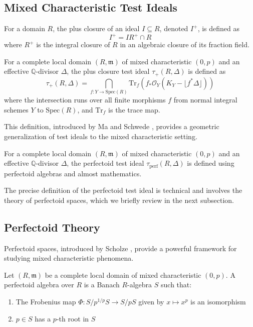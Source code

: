 \subsection{Mixed Characteristic Test Ideals}

\begin{definition}\label{def:plus-closure}
For a domain $R$, the plus closure of an ideal $I \subseteq R$, denoted $I^+$, is defined as
$$I^+ = I R^+ \cap R$$
where $R^+$ is the integral closure of $R$ in an algebraic closure of its fraction field.
\end{definition}

\begin{definition}\label{def:plus-closure-test-ideal}
For a complete local domain $(R,\mathfrak{m})$ of mixed characteristic $(0,p)$ and an effective $\mathbb{Q}$-divisor $\Delta$, the plus closure test ideal $\tau_+(R,\Delta)$ is defined as
$$\tau_+(R,\Delta) = \bigcap_{f: Y \to \text{Spec}(R)} \text{Tr}_f(f_*\mathcal{O}_Y(K_Y - \lfloor f^*\Delta\rfloor))$$
where the intersection runs over all finite morphisms $f$ from normal integral schemes $Y$ to $\text{Spec}(R)$, and $\text{Tr}_f$ is the trace map.
\end{definition}

This definition, introduced by Ma and Schwede \cite{MS21}, provides a geometric generalization of test ideals to the mixed characteristic setting.

\begin{definition}\label{def:perfectoid-test-ideal}
For a complete local domain $(R,\mathfrak{m})$ of mixed characteristic $(0,p)$ and an effective $\mathbb{Q}$-divisor $\Delta$, the perfectoid test ideal $\tau_{\text{perf}}(R,\Delta)$ is defined using perfectoid algebras and almost mathematics.
\end{definition}

The precise definition of the perfectoid test ideal is technical and involves the theory of perfectoid spaces, which we briefly review in the next subsection.

\subsection{Perfectoid Theory}

Perfectoid spaces, introduced by Scholze \cite{Sch12}, provide a powerful framework for studying mixed characteristic phenomena.

\begin{definition}\label{def:perfectoid-algebra}
Let $(R,\mathfrak{m})$ be a complete local domain of mixed characteristic $(0,p)$. A perfectoid algebra over $R$ is a Banach $R$-algebra $S$ such that:
\begin{enumerate}
    \item The Frobenius map $\Phi: S/p^{1/p}S \to S/pS$ given by $x \mapsto x^p$ is an isomorphism
    \item $p \in S$ has a $p$-th root in $S$
\end{enumerate}
\end{definition}

